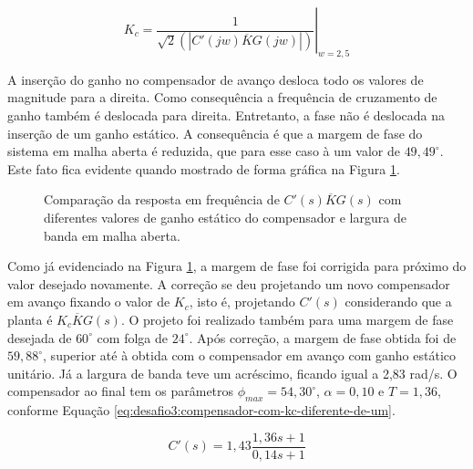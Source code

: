 \begin{equation}
    \label{eq:desafio3:calculo-de-kc}
    K_{c} = \left. \frac{1}{\sqrt{2}(|{C}'(jw)\overline{K}G(jw)|)} \right |_{w = 2,5}
\end{equation}

A inserção do ganho no compensador de avanço desloca todo os valores de
magnitude para a direita. Como consequência a frequência de cruzamento de ganho
também é deslocada para direita. Entretanto, a fase não é deslocada na inserção
de um ganho estático. A consequência é que a margem de fase do sistema em
malha aberta é reduzida, que para esse caso à um valor de
$49,49^{\circ}$. Este fato fica evidente quando mostrado de forma gráfica na
Figura \ref{fig:desafio-3:questao-5-6-malha-aberta}.

\begin{figure}[ht!]
    \caption{Comparação da resposta em frequência de ${C}'(s)\overline{K}G(s)$ com
    diferentes valores de ganho estático do compensador e largura de banda em
    malha aberta.}
    \vspace{-10pt}
    \hspace{-30pt}
    \label{fig:desafio-3:questao-5-6-malha-aberta}
    \begin{minipage}{\linewidth}
        
    \end{minipage}
\end{figure}

Como já evidenciado na Figura \ref{fig:desafio-3:questao-5-6-malha-aberta}, a
margem de fase foi corrigida para próximo do valor desejado novamente. A
correção se deu projetando um novo compensador em avanço fixando o valor de
$K_{c}$, isto é, projetando ${C}'(s)$ considerando que a planta é
$K_{c}\overline{K}G(s)$. O projeto foi realizado também para uma margem de fase
desejada de $60^{\circ}$ com folga de $24^{\circ}$. Após correção, a margem de
fase obtida foi de $59,88^{\circ}$, superior até à obtida com o compensador em
avanço com ganho estático unitário. Já a largura de banda teve um acréscimo,
ficando igual a 2,83 rad/s. O compensador ao final tem os parâmetros $\phi_{max}
= 54,30^{\circ}$, $\alpha = 0,10$ e $T = 1,36$, conforme Equação
\ref{eq:desafio3:compensador-com-kc-diferente-de-um}.

\begin{equation}
    \label{eq:desafio3:compensador-com-kc-diferente-de-um}
    C'(s) = 1,43\frac{1,36s + 1}{0,14s + 1}
\end{equation}


